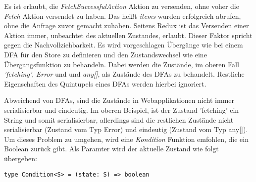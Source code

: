 Es ist erlaubt, die \textit{FetchSuccessfulAction} Aktion zu versenden, ohne voher die \textit{Fetch} Aktion versendet zu haben. Das heißt \textit{items} wurden erfolgreich abrufen, ohne die Anfrage zuvor gemacht zuhaben. Seitens Redux ist das Versenden einer Aktion immer, unbeachtet des aktuellen Zustandes, erlaubt. Dieser Faktor spricht gegen die Nachvollziehbarkeit. Es wird vorgeschlagen Übergänge wie bei einem DFA für den Store zu definieren und den Zustandswechsel wie eine Übergangsfunktion zu behandeln. Dabei werden die Zustände, im oberen Fall \textit{'fetching'}, \textit{Error} und und \textit{any[]}, als Zustände des DFAs zu behandelt. Restliche Eigenschaften des Quintupels eines DFAs werden hierbei ignoriert.

Abweichend von DFAs, sind die Zustände in Webapplikationen nicht immer serialisierbar und eindeutig. Im oberen Beispiel, ist der Zustand 'fetching' ein String und somit serialisierbar, allerdings sind die restlichen Zustände nicht serialisierbar (Zustand vom Typ Error) und eindeutig (Zustand vom Typ any[]). Um dieses Problem zu umgehen, wird eine \textit{Kondition} Funktion emfohlen, die ein Boolean zurück gibt. Als Paramter wird der aktuelle Zustand wie folgt übergeben:

\begin{lstlisting}
type Condition<S> = (state: S) => boolean
\end{lstlisting}

